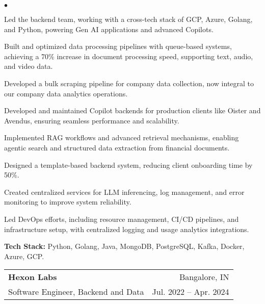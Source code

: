 \documentclass[margin, 11pt]{res}
\makeatletter
\newcommand{\resumeSubheading}[4]{

\begin{tabular*}{1.01\textwidth}{@{\hspace{-4pt}}l @{\extracolsep{\fill}} r}
\textbf{#1} & #2 \\
      {#3} &  {#4}
\end{tabular*}\vspace{-2pt}
}
\newenvironment{list2}{
	\begin{list}{$\bullet$}{%
	    \small
		\setlength{\itemsep}{0in}
		\setlength{\parsep}{0in} \setlength{\parskip}{0in}
		\setlength{\topsep}{0in} \setlength{\partopsep}{0in}
		\setlength{\leftmargin}{0.2in}}}{\end{list}}
\makeatother
\begin{document}
\begin{resume}
\begin{list2}
    \item{Led the backend team, working with a cross-tech stack of GCP, Azure, Golang, and Python, powering Gen AI applications and advanced Copilots.}
    \item{Built and optimized data processing pipelines with queue-based systems, achieving a 70\% increase in document processing speed, supporting text, audio, and video data.}
    \item{Developed a bulk scraping pipeline for company data collection, now integral to our company data analytics operations.}
    \item{Developed and maintained Copilot backends for production clients like Oister and Avendus, ensuring seamless performance and scalability.}
    \item{Implemented RAG workflows and advanced retrieval mechanisms, enabling agentic search and structured data extraction from financial documents.}
    \item{Designed a template-based backend system, reducing client onboarding time by 50\%.}
    \item{Created centralized services for LLM inferencing, log management, and error monitoring to improve system reliability.}
    \item{Led DevOps efforts, including resource management, CI/CD pipelines, and infrastructure setup, with centralized logging and usage analytics integrations.}
    \item{\textbf{Tech Stack:} Python, Golang, Java, MongoDB, PostgreSQL, Kafka, Docker, Azure, GCP.}
\end{list2}

\resumeSubheading{{\bf Hexon Labs}}{Bangalore, IN}
                 {Software Engineer, Backend and Data}{Jul. 2022 -- Apr. 2024}


\end{resume}
\end{document}
